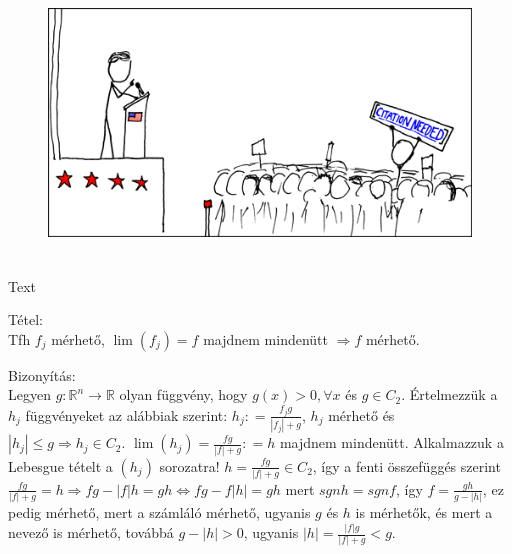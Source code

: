 \documentclass[12pt,a4paper]{scrartcl}
\newenvironment{tetel}{}{}
\newenvironment{bizonyitas}{}{}
\newenvironment{ajanlofig}{\begin{figure}\begin{center}}{
\end{center}\end{figure}}
\begin{document}
\begin{ajanlo}

\begin{ajanlofig}

\href{https://xkcd.com}{\includegraphics[width=5.20833in,height=2.82292in]{wikipedian_protester.png}}

\end{ajanlofig}

Text

\end{ajanlo}

\begin{tetel}

Tétel:\\
Tfh \(f_{j}\) mérhető, \(\lim\left( f_{j} \right) = f\) majdnem
mindenütt \(\left. \Rightarrow f \right.\) mérhető.

\end{tetel}

\begin{bizonyitas}

Bizonyítás:\\
Legyen \(\left. g:{\mathbb{R}}^{n}\rightarrow{\mathbb{R}} \right.\)
olyan függvény, hogy \(g\left( x \right) > 0,\forall x\) és
\(g \in C_{2}\). Értelmezzük a \(h_{j}\) függvényeket az alábbiak
szerint: \(h_{j}: = \frac{f_{j}g}{\left| f_{j} \right| + g}\), \(h_{j}\)
mérhető és
\(\left. \left| h_{j} \right| \leq g\Rightarrow h_{j} \in C_{2} \right.\).
\(\lim\left( h_{j} \right) = \frac{fg}{\left| f \right| + g}: = h\)
majdnem mindenütt. Alkalmazzuk a Lebesgue tételt a
\(\left( h_{j} \right)\) sorozatra!
\(h = \frac{fg}{\left| f \right| + g} \in C_{2}\), így a fenti
összefüggés szerint
\(\left. \frac{fg}{\left| f \right| + g} = h\Rightarrow fg - \left| f \right|h = gh\Leftrightarrow fg - f\left| h \right| = gh \right.\)
mert \({sgn}h = {sgn}f\), így \(f = \frac{gh}{g - \left| h \right|}\),
ez pedig mérhető, mert a számláló mérhető, ugyanis \(g\) és \(h\) is
mérhetők, és mert a nevező is mérhető, továbbá
\(g - \left| h \right| > 0\), ugyanis
\(\left| h \right| = \frac{\left| f \right|g}{\left| f \right| + g} < g\).

\end{bizonyitas}
\end{document}
